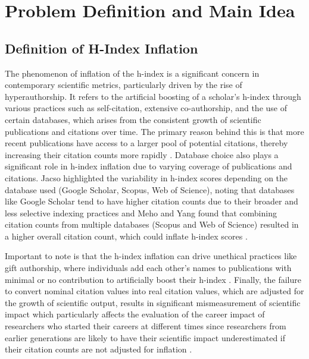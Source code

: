 \chapter{Problem Definition and Main Idea}
\label{ch:problem}

\section{Definition of H-Index Inflation}
The phenomenon of inflation of the h-index is a significant concern in
contemporary scientific metrics, particularly driven by the rise of
hyperauthorship. It refers to the artificial boosting of a scholar's h-index
through various practices such as self-citation, extensive co-authorship, and
the use of certain databases, which arises from the consistent growth of
scientific publications and citations over time. The primary reason behind this
is that more recent publications have access to a larger pool of potential
citations, thereby increasing their citation counts more rapidly
\cite{norris2010h, koltun2021h, bi2023four}. Database choice also plays a
significant role in h-index inflation due to varying coverage of publications
and citations. Jacso highlighted the variability in h-index scores depending on
the database used (Google Scholar, Scopus, Web of Science), noting that
databases like Google Scholar tend to have higher citation counts due to their
broader and less selective indexing practices and Meho and Yang found that
combining citation counts from multiple databases (Scopus and Web of Science)
resulted in a higher overall citation count, which could inflate h-index scores
\cite{norris2010h}.

Important to note is that the h-index inflation can drive unethical practices
like gift authorship, where individuals add each other’s names to publications
with minimal or no contribution to artificially boost their h-index
\cite{bi2023four}. Finally, the failure to convert nominal citation values into
real citation values, which are adjusted for the growth of scientific output,
results in significant mismeasurement of scientific impact which particularly
affects the evaluation of the career impact of researchers who started their
careers at different times since researchers from earlier generations are
likely to have their scientific impact underestimated if their citation counts
are not adjusted for inflation \cite{petersen2019methods}.

